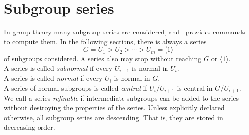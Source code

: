 \newpage

\section{Subgroup series\protect\footnotemark} 
In group theory many subgroup series are considered, and \gap\ provides commands to
compute them. 
In the following sections, there is always a series 
\[
G = U_1 > U_2 > \cdots > U_m = \langle 1 \rangle
\]
of subgroups considered.
A series also may stop without reaching $G$ or $\langle 1 \rangle$.\\[4pt] 
A series is called \emph{subnormal} if every $U_{i+1}$ is normal in $U_i$.\\[4pt] 
A series is called \emph{normal} if every $U_i$ is normal in $G$.\\[4pt] 
A series of normal subgroups is called \emph{central} if $U_i/U_{i+1}$ is central in 
$G/U_{i+1}$.\\[4pt] 
We call a series \emph{refinable} if intermediate subgroups can be added to the
series without destroying the properties of the series.
Unless explicitly declared otherwise, all subgroup series are descending. That is, they are stored in decreasing
order.

